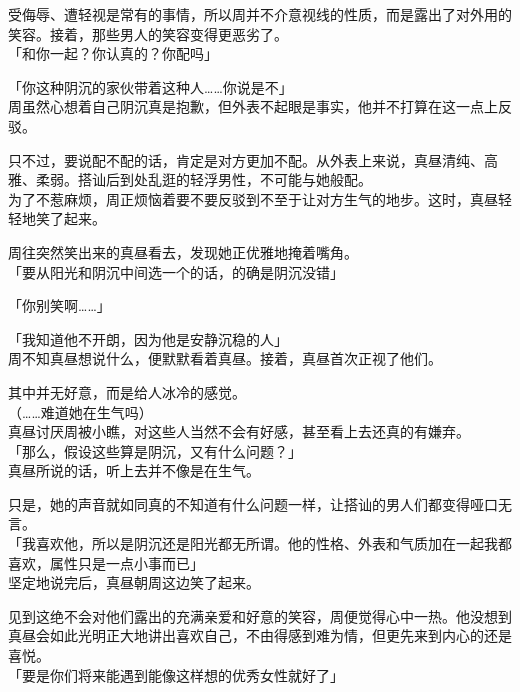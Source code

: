 受侮辱、遭轻视是常有的事情，所以周并不介意视线的性质，而是露出了对外用的笑容。接着，那些男人的笑容变得更恶劣了。\\

「和你一起？你认真的？你配吗」

「你这种阴沉的家伙带着这种人……你说是不」\\

周虽然心想着自己阴沉真是抱歉，但外表不起眼是事实，他并不打算在这一点上反驳。

只不过，要说配不配的话，肯定是对方更加不配。从外表上来说，真昼清纯、高雅、柔弱。搭讪后到处乱逛的轻浮男性，不可能与她般配。\\

为了不惹麻烦，周正烦恼着要不要反驳到不至于让对方生气的地步。这时，真昼轻轻地笑了起来。

周往突然笑出来的真昼看去，发现她正优雅地掩着嘴角。\\

「要从阳光和阴沉中间选一个的话，的确是阴沉没错」

「你别笑啊……」

「我知道他不开朗，因为他是安静沉稳的人」\\

周不知真昼想说什么，便默默看着真昼。接着，真昼首次正视了他们。

其中并无好意，而是给人冰冷的感觉。\\

（……难道她在生气吗）\\

真昼讨厌周被小瞧，对这些人当然不会有好感，甚至看上去还真的有嫌弃。\\

「那么，假设这些算是阴沉，又有什么问题？」\\

真昼所说的话，听上去并不像是在生气。

只是，她的声音就如同真的不知道有什么问题一样，让搭讪的男人们都变得哑口无言。\\

「我喜欢他，所以是阴沉还是阳光都无所谓。他的性格、外表和气质加在一起我都喜欢，属性只是一点小事而已」\\

坚定地说完后，真昼朝周这边笑了起来。

见到这绝不会对他们露出的充满亲爱和好意的笑容，周便觉得心中一热。他没想到真昼会如此光明正大地讲出喜欢自己，不由得感到难为情，但更先来到内心的还是喜悦。\\

「要是你们将来能遇到能像这样想的优秀女性就好了」\\


